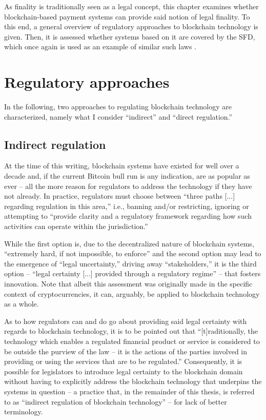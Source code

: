As finality is traditionally seen as a legal concept, this chapter examines whether blockchain-based payment systems can provide said notion of legal finality.
To this end, a general overview of regulatory approaches to blockchain technology is given.
Then, it is assessed whether systems based on it are covered by the SFD, which once again is used as an example of similar such laws .

\section{Regulatory approaches}

In the following, two approaches to regulating blockchain technology are characterized, namely what I consider ``indirect'' and ``direct regulation.''

\subsection{Indirect regulation}

At the time of this writing, blockchain systems have existed for well over a decade and, if the current Bitcoin bull run \autocite{nytimes2021bitcoinrecord} is any indication, are as popular as ever -- all the more reason for regulators to address the technology if they have not already.
In practice, regulators must choose between ``three paths [...] regarding regulation in this area,'' i.e., banning and/or restricting, ignoring or attempting to ``provide clarity and a regulatory framework regarding how such activities can operate within the jurisdiction.''  \autocite[210]{ellul2020}

While the first option is, due to the decentralized nature of blockchain systems, ``extremely hard, if not impossible, to enforce'' and the second option may lead to the emergence of ``legal uncertainty,'' driving away ``stakeholders,'' it is the third option -- ``legal certainty [...] provided through a regulatory regime'' -- that fosters innovation. \autocite[210]{ellul2020}
Note that albeit this assessment was originally made in the specific context of cryptocurrencies, it can, arguably, be applied to blockchain technology as a whole.

As to how regulators can and do go about providing said legal certainty with regards to blockchain technology, it is to be pointed out that ``[t]raditionally, the technology which enables a regulated financial product or service is considered to be outside the purview of the law -- it is the actions of the parties involved in providing or using the services that are to be regulated.'' \autocite[211]{ellul2020}
Consequently, it is possible for legislators to introduce legal certainty to the blockchain domain without having to explicitly address the blockchain technology that underpins the systems in question -- a practice that, in the remainder of this thesis, is referred to as ``indirect regulation of blockchain technology'' -- for lack of better terminology.


